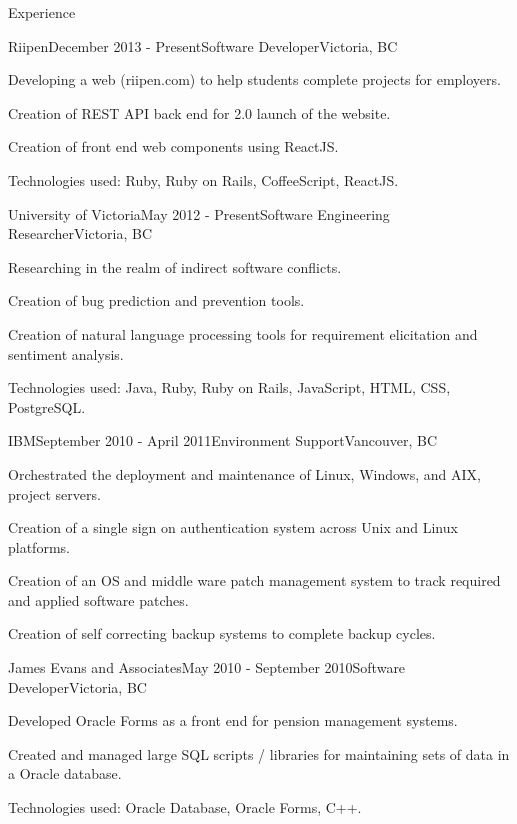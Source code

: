 \documentclass{resume} %
\begin{document}
\begin{rSection}{Experience}


\begin{rSubsection}{Riipen}{December 2013 - Present}{Software Developer}{Victoria, BC}
\item Developing a web  (riipen.com) to help students complete projects for employers.
\item Creation of REST API back end for 2.0 launch of the website.
\item Creation of front end web components using ReactJS.
\item Technologies used: Ruby, Ruby on Rails, CoffeeScript, ReactJS.
\end{rSubsection}


\begin{rSubsection}{University of Victoria}{May 2012 - Present}{Software Engineering Researcher}{Victoria, BC}
\item Researching in the realm of indirect software conflicts.
\item Creation of bug prediction and prevention tools.
\item Creation of natural language processing tools for requirement elicitation and sentiment analysis.
\item Technologies used: Java, Ruby, Ruby on Rails, JavaScript, HTML, CSS, PostgreSQL.
\end{rSubsection}


\begin{rSubsection}{IBM}{September 2010 - April 2011}{Environment Support}{Vancouver, BC}
\item Orchestrated the deployment and maintenance of Linux, Windows, and AIX, project servers.
\item Creation of a single sign on authentication system across Unix and Linux platforms.
\item Creation of an OS and middle ware patch management system to track required and applied software patches.
\item Creation of self correcting backup systems to complete backup cycles.
\end{rSubsection}


\begin{rSubsection}{James Evans and Associates}{May 2010 - September 2010}{Software Developer}{Victoria, BC}
\item Developed Oracle Forms as a front end for pension management systems.
\item Created and managed large SQL scripts / libraries for maintaining sets of data in a Oracle database.
\item Technologies used: Oracle Database, Oracle Forms, C++.
\end{rSubsection}

\end{rSection}
\end{document}
